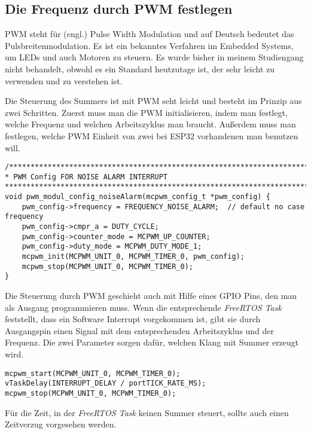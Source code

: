 \subsection{Die Frequenz durch PWM festlegen}
\label{sec:main:pwm}
PWM steht für (engl.) Pulse Width Modulation und auf Deutsch bedeutet das Pulsbreitenmodulation. Es ist ein bekanntes Verfahren im Embedded Systems, um LEDs und auch Motoren zu steuern. Es wurde bisher in meinem Studiengang nicht behandelt, obwohl es ein Standard heutzutage ist, der sehr leicht zu verwenden und zu verstehen ist. 

Die Steuerung des Summers ist mit PWM seht leicht und besteht im Prinzip aus zwei Schritten. Zuerst muss man die PWM initialisieren, indem man festlegt, welche Frequenz und welchen Arbeitszyklus man braucht. Außerdem muss man festlegen, welche PWM Einheit von zwei bei ESP32 vorhandenen man benutzen will.   
 \begin{lstlisting}
/**********************************************************************************
* PWM Config FOR NOISE ALARM INTERRUPT
**********************************************************************************/
void pwm_modul_config_noiseAlarm(mcpwm_config_t *pwm_config) {
	pwm_config->frequency = FREQUENCY_NOISE_ALARM;  // default no case frequency
	pwm_config->cmpr_a = DUTY_CYCLE;
	pwm_config->counter_mode = MCPWM_UP_COUNTER;
	pwm_config->duty_mode = MCPWM_DUTY_MODE_1;
	mcpwm_init(MCPWM_UNIT_0, MCPWM_TIMER_0, pwm_config);
	mcpwm_stop(MCPWM_UNIT_0, MCPWM_TIMER_0);
}
\end{lstlisting}

Die Steuerung durch PWM geschieht auch mit Hilfe eines GPIO Pins, den man als Ausgang programmieren muss. Wenn die entsprechende \textit{FreeRTOS Task} feststellt, dass ein Software Interrupt vorgekommen ist, gibt sie durch Ausgangspin einen Signal mit dem entsprechenden Arbeitszyklus und der Frequenz. Die zwei Parameter sorgen dafür, welchen Klang mit Summer erzeugt wird. 
\begin{lstlisting}
mcpwm_start(MCPWM_UNIT_0, MCPWM_TIMER_0);
vTaskDelay(INTERRUPT_DELAY / portTICK_RATE_MS);
mcpwm_stop(MCPWM_UNIT_0, MCPWM_TIMER_0);
\end{lstlisting}

Für die Zeit, in der \textit{FreeRTOS Task} keinen Summer steuert, sollte auch einen Zeitverzug vorgesehen werden. 

